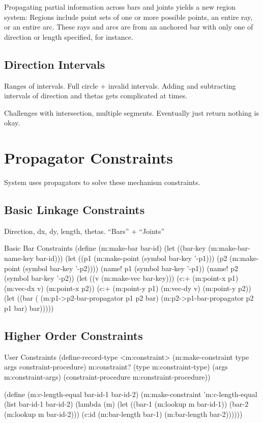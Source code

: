 Propagating partial information across bars and joints yields a new
region system: Regions include point sets of one or more possible
points, an entire ray, or an entire arc. These rays and arcs are
from an anchored bar with only one of direction or length specified,
for instance.

\subsection{Direction Intervals}

Ranges of intervals. Full circle + invalid intervals. Adding and
subtracting intervals of direction and thetas gets complicated at times.

Challenges with intersection, multiple segments. Eventually just
return nothing is okay.

\section{Propagator Constraints}

System uses propagators to solve these mechanism constraints.

\subsection{Basic Linkage Constraints}

Direction, dx, dy, length, thetas. ``Bars'' + ``Joints''

\begin{code-listing}{Basic Bar Constraints}
(define (m:make-bar bar-id)
  (let ((bar-key (m:make-bar-name-key bar-id)))
    (let ((p1 (m:make-point (symbol bar-key '-p1)))
          (p2 (m:make-point (symbol bar-key '-p2))))
      (name! p1 (symbol bar-key '-p1))
      (name! p2 (symbol bar-key '-p2))
      (let ((v (m:make-vec bar-key)))
        (c:+ (m:point-x p1)
             (m:vec-dx v)
             (m:point-x p2))
        (c:+ (m:point-y p1)
             (m:vec-dy v)
             (m:point-y p2))
        (let ((bar (%
          (m:p1->p2-bar-propagator p1 p2 bar)
          (m:p2->p1-bar-propagator p2 p1 bar)
          bar)))))
\end{code-listing}

\subsection{Higher Order Constraints}

\begin{code-listing}{User Constraints}
(define-record-type <m:constraint>
  (m:make-constraint type args constraint-procedure)
  m:constraint?
  (type m:constraint-type)
  (args m:constraint-args)
  (constraint-procedure m:constraint-procedure))

(define (m:c-length-equal bar-id-1 bar-id-2)
  (m:make-constraint
   'm:c-length-equal
   (list bar-id-1 bar-id-2)
   (lambda (m)
     (let ((bar-1 (m:lookup m bar-id-1))
           (bar-2 (m:lookup m bar-id-2)))
       (c:id
        (m:bar-length bar-1)
        (m:bar-length bar-2))))))
\end{code-listing}

